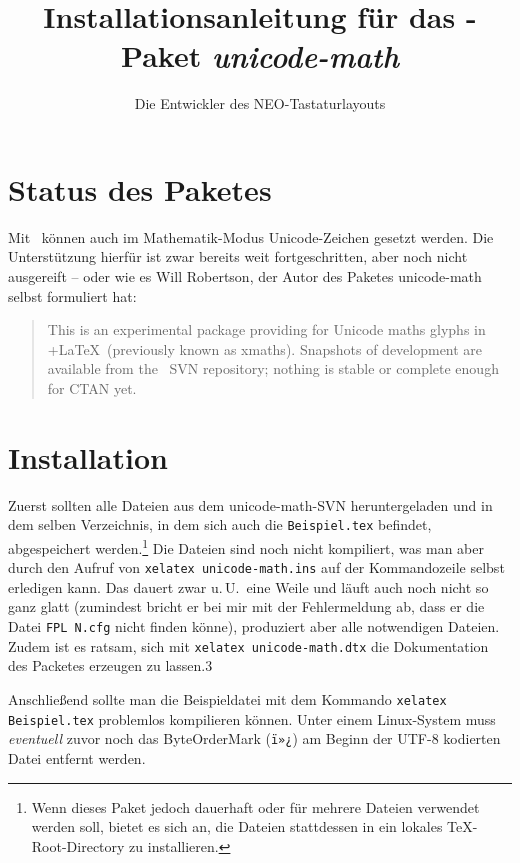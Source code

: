 ﻿\documentclass{scrartcl}
\begin{document}
\title{Installationsanleitung für das \XeTeX-Paket \emph{unicode-math}}
\author{Die Entwickler des NEO-Tastaturlayouts}
\maketitle
\tableofcontents

\section{Status des Paketes}
Mit \XeTeX\ können auch im Mathematik-Modus Unicode-Zeichen gesetzt werden. Die Unterstützung hierfür ist zwar bereits weit fortgeschritten, aber noch nicht ausgereift – oder wie es Will Robertson, der Autor des Paketes unicode-math selbst formuliert hat:
\begin{quote}
This is an experimental package providing for Unicode maths glyphs in \XeTeX+\LaTeX\ (previously known as xmaths). Snapshots of development are available from the \XeTeX\ SVN repository; nothing is stable or complete enough for CTAN yet.
\end{quote}

\section{Installation}
Zuerst sollten alle Dateien aus dem unicode-math-SVN heruntergeladen und in dem selben Verzeichnis, in dem sich auch die \verb|Beispiel.tex| befindet, abgespeichert werden.\footnote{Wenn dieses Paket jedoch dauerhaft oder für mehrere Dateien verwendet werden soll, bietet es sich an, die Dateien stattdessen in ein lokales \TeX-Root-Directory zu installieren.} Die Dateien sind noch nicht kompiliert, was man aber durch den Aufruf von \verb|xelatex unicode-math.ins| auf der Kommandozeile selbst erledigen kann. Das dauert zwar u.\,U.\ eine Weile und läuft auch noch nicht so ganz glatt (zumindest bricht er bei mir mit der Fehlermeldung ab, dass er die Datei \verb|FPL N.cfg| nicht finden könne), produziert aber alle notwendigen Dateien. Zudem ist es ratsam, sich mit \verb|xelatex unicode-math.dtx| die Dokumentation des Packetes erzeugen zu lassen.3

Anschließend sollte man die Beispieldatei mit dem Kommando \verb|xelatex Beispiel.tex| problemlos kompilieren können. Unter einem Linux-System muss \emph{eventuell} zuvor noch das ByteOrderMark (\verb|ï»¿|) am Beginn der UTF-8 kodierten Datei entfernt werden.
\end{document}
